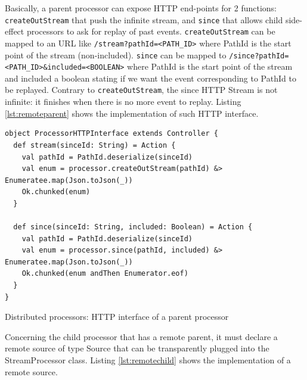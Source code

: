 Basically, a parent processor can expose HTTP end-points for 2 functions: \verb|createOutStream| that push the infinite stream, and \verb|since| that allows child side-effect processors to ask for replay of past events.
\verb|createOutStream| can be mapped to an URL like \verb|/stream?pathId=<PATH_ID>| where PathId is the start point of the stream (non-included).
\verb|since| can be mapped to \verb|/since?pathId=<PATH_ID>&included=<BOOLEAN>| where PathId is the start point of the stream and included a boolean stating if we want the event
corresponding to PathId to be replayed. Contrary to \verb|createOutStream|, the since HTTP Stream is not infinite: it finishes when there is no more event to replay.
Listing \ref{lst:remoteparent} shows the implementation of such HTTP interface.

\begin{listing}[h]
\begin{verbatim}
object ProcessorHTTPInterface extends Controller {
  def stream(sinceId: String) = Action {
    val pathId = PathId.deserialize(sinceId)
    val enum = processor.createOutStream(pathId) &> Enumeratee.map(Json.toJson(_))
    Ok.chunked(enum)
  }

  def since(sinceId: String, included: Boolean) = Action {
    val pathId = PathId.deserialize(sinceId)
    val enum = processor.since(pathId, included) &> Enumeratee.map(Json.toJson(_))
    Ok.chunked(enum andThen Enumerator.eof)
  }
}
\end{verbatim}
\caption{Distributed processors: HTTP interface of a parent processor}
\label{lst:remoteparent}
\end{listing}

Concerning the child processor that has a remote parent, it must declare a remote source of type Source that can be transparently plugged into the StreamProcessor class. Listing \ref{lst:remotechild} shows the implementation of a remote source.

